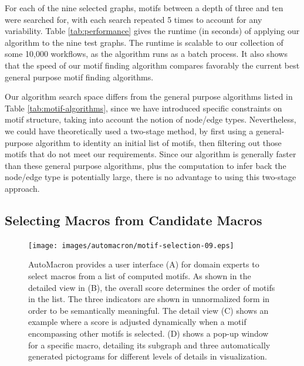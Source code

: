 For each of the nine selected graphs, motifs between a depth of three and ten were searched for, with each search repeated 5 times to account for any variability.
Table \ref{tab:performance} gives the runtime (in seconds) of applying our algorithm to the nine test graphs.
The runtime is scalable to our collection of some 10,000 workflows, as the algorithm runs as a batch process.
It also shows that the speed of our motif finding algorithm compares favorably the current best general purpose motif finding algorithms.

Our algorithm search space differs from the general purpose algorithms listed in Table \ref{tab:motif-algorithms}, since we have introduced specific constraints on motif structure, taking into account the notion of node/edge types.
Nevertheless, we could have theoretically used a two-stage method, by first using a general-purpose algorithm to identity an initial list of motifs, then filtering out those motifs that do not meet our requirements.
Since our algorithm is generally faster than these general purpose algorithms, plus the computation to infer back the node/edge type is potentially large, there is no advantage to using this two-stage approach.

\subsection{Selecting Macros from Candidate Macros}
\label{sec:Selection}

\begin{figure}[t!]
\centering
\texttt{[image: images/automacron/motif-selection-09.eps]}
\caption{AutoMacron provides a user interface (A) for domain experts to select macros from a list of computed motifs.
As shown in the detailed view in (B), the overall score determines the order of motifs in the list.
The three indicators are shown in unnormalized form in order to be semantically meaningful.
The detail view (C) shows an example where a score is adjusted dynamically when a motif encompassing other motifs is selected.
(D) shows a pop-up window for a specific macro, detailing its subgraph and three automatically generated pictograms for different levels of details in visualization.}
\vspace{-4mm}
\label{fig:motif-selection}
\end{figure}

